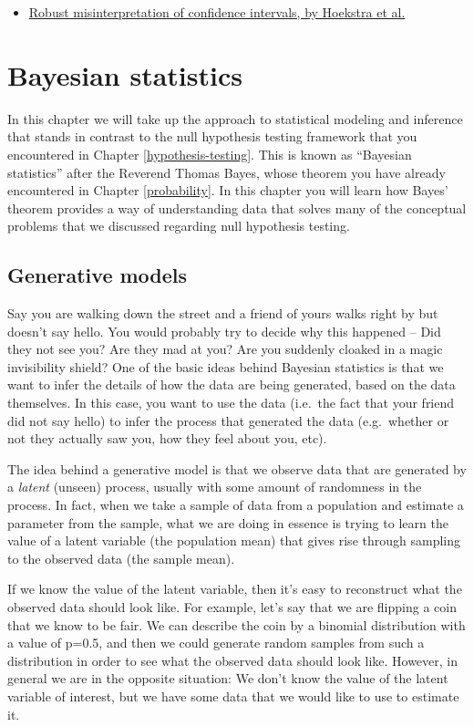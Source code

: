 \documentclass[]{book}
\providecommand{\tightlist}{%
  \setlength{\itemsep}{0pt}\setlength{\parskip}{0pt}}
\theoremstyle{definition}
\theoremstyle{definition}
\theoremstyle{definition}
\theoremstyle{remark}
\begin{document}
\begin{itemize}
\tightlist
\item
  \href{http://www.ejwagenmakers.com/inpress/HoekstraEtAlPBR.pdf}{Robust
  misinterpretation of confidence intervals, by Hoekstra et al.}
\end{itemize}

\chapter{Bayesian statistics}\label{bayesian-statistics}

In this chapter we will take up the approach to statistical modeling and
inference that stands in contrast to the null hypothesis testing
framework that you encountered in Chapter \ref{hypothesis-testing}. This
is known as ``Bayesian statistics'' after the Reverend Thomas Bayes,
whose theorem you have already encountered in Chapter \ref{probability}.
In this chapter you will learn how Bayes' theorem provides a way of
understanding data that solves many of the conceptual problems that we
discussed regarding null hypothesis testing.

\section{Generative models}\label{generative-models}

Say you are walking down the street and a friend of yours walks right by
but doesn't say hello. You would probably try to decide why this
happened -- Did they not see you? Are they mad at you? Are you suddenly
cloaked in a magic invisibility shield? One of the basic ideas behind
Bayesian statistics is that we want to infer the details of how the data
are being generated, based on the data themselves. In this case, you
want to use the data (i.e.~the fact that your friend did not say hello)
to infer the process that generated the data (e.g.~whether or not they
actually saw you, how they feel about you, etc).

The idea behind a generative model is that we observe data that are
generated by a \emph{latent} (unseen) process, usually with some amount
of randomness in the process. In fact, when we take a sample of data
from a population and estimate a parameter from the sample, what we are
doing in essence is trying to learn the value of a latent variable (the
population mean) that gives rise through sampling to the observed data
(the sample mean).

If we know the value of the latent variable, then it's easy to
reconstruct what the observed data should look like. For example, let's
say that we are flipping a coin that we know to be fair. We can describe
the coin by a binomial distribution with a value of p=0.5, and then we
could generate random samples from such a distribution in order to see
what the observed data should look like. However, in general we are in
the opposite situation: We don't know the value of the latent variable
of interest, but we have some data that we would like to use to estimate
it.
\end{document}
